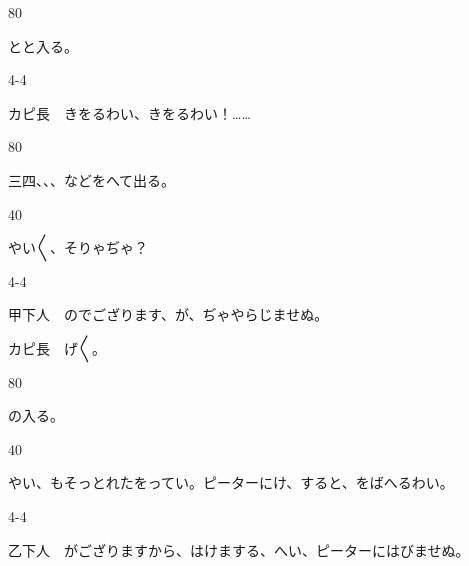 \documentclass[tate,paper=b6j,jafontsize=9pt]{jlreq}
\begin{document}
\begin{azconvIndented}{8\zw}{0\zw}

とと入る。

\end{azconvIndented}
\begin{azconvIndented}{4\zw}{-4\zw}

カピ長　きをるわい、きをるわい！……

\end{azconvIndented}
\begin{azconvIndented}{8\zw}{0\zw}

三四、、、などをへて出る。

\end{azconvIndented}
\begin{azconvIndented}{4\zw}{0\zw}

やい{〳〵}、そりゃぢゃ？

\end{azconvIndented}
\begin{azconvIndented}{4\zw}{-4\zw}

甲下人　のでござります、が、ぢゃやらじませぬ。

カピ長　げ{〳〵}。

\end{azconvIndented}
\begin{azconvIndented}{8\zw}{0\zw}

の入る。

\end{azconvIndented}
\begin{azconvIndented}{4\zw}{0\zw}

やい、もそっとれたをってい。ピーターにけ、すると、をばへるわい。

\end{azconvIndented}
\begin{azconvIndented}{4\zw}{-4\zw}

乙下人　がござりますから、はけまする、へい、ピーターにはびませぬ。

\end{azconvIndented}
\end{document}
